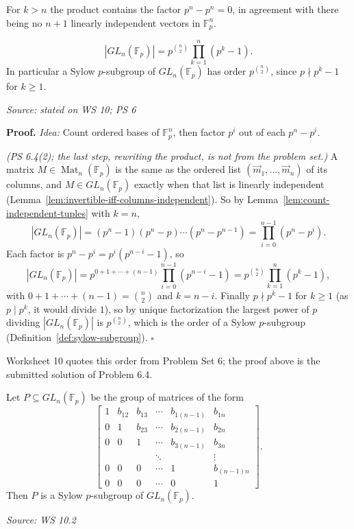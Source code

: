 \documentclass[11pt]{report}
\renewenvironment{proof}[1][Proof]{\noindent\textbf{#1.} }{\hfill$\square$\par\vspace{5pt}}
\newcommand{\srcline}[1]{\par\hfill{\footnotesize\textit{Source: #1}}}
\begin{document}
For $k > n$ the product contains the factor $p^n - p^n = 0$, in agreement with there being no $n+1$ linearly independent vectors in $\mathbb{F}_p^n$.

\begin{propbox}\label{prop:order-gln-fp}
\[ |GL_n(\mathbb{F}_p)| = p^{\binom{n}{2}} \prod_{k=1}^{n} (p^k - 1). \]
In particular a Sylow $p$-subgroup of $GL_n(\mathbb{F}_p)$ has order $p^{\binom{n}{2}}$, since $p \nmid p^k - 1$ for $k \geq 1$.
\srcline{stated on WS 10; PS 6}
\end{propbox}

\begin{proof}
\textit{Idea:} Count ordered bases of $\mathbb{F}_p^n$, then factor $p^i$ out of each $p^n - p^i$.\par
\textit{(PS 6.4(2); the last step, rewriting the product, is not from the problem set.)} A matrix $M \in \operatorname{Mat}_n(\mathbb{F}_p)$ is the same as the ordered list $(\vec m_1, \ldots, \vec m_n)$ of its columns, and $M \in GL_n(\mathbb{F}_p)$ exactly when that list is linearly independent (Lemma~\ref{lem:invertible-iff-columns-independent}). So by Lemma~\ref{lem:count-independent-tuples} with $k = n$,
\[ |GL_n(\mathbb{F}_p)| = (p^n - 1)(p^n - p) \cdots (p^n - p^{n-1}) = \prod_{i=0}^{n-1} (p^n - p^i) . \]
Each factor is $p^n - p^i = p^i(p^{n-i} - 1)$, so
\[ |GL_n(\mathbb{F}_p)| = p^{0 + 1 + \cdots + (n-1)} \prod_{i=0}^{n-1} (p^{n-i} - 1) = p^{\binom{n}{2}} \prod_{k=1}^{n} (p^k - 1), \]
with $0 + 1 + \cdots + (n-1) = \binom{n}{2}$ and $k = n - i$. Finally $p \nmid p^k - 1$ for $k \geq 1$ (as $p \mid p^k$, it would divide $1$), so by unique factorization the largest power of $p$ dividing $|GL_n(\mathbb{F}_p)|$ is $p^{\binom{n}{2}}$, which is the order of a Sylow $p$-subgroup (Definition~\ref{def:sylow-subgroup}).
\end{proof}

Worksheet 10 quotes this order from Problem Set 6; the proof above is the submitted solution of Problem 6.4.

\begin{propbox}\label{prop:unitriangular-sylow}
Let $P \subseteq GL_n(\mathbb{F}_p)$ be the group of matrices of the form
\[ \begin{bmatrix} 1 & b_{12} & b_{13} & \cdots & b_{1(n-1)} & b_{1n} \\ 0 & 1 & b_{23} & \cdots & b_{2(n-1)} & b_{2n} \\ 0 & 0 & 1 & \cdots & b_{3(n-1)} & b_{3n} \\ & & & \ddots & & \vdots \\ 0 & 0 & 0 & \cdots & 1 & b_{(n-1)n} \\ 0 & 0 & 0 & \cdots & 0 & 1 \end{bmatrix}. \]
Then $P$ is a Sylow $p$-subgroup of $GL_n(\mathbb{F}_p)$.
\srcline{WS 10.2}
\end{propbox}
\end{document}
